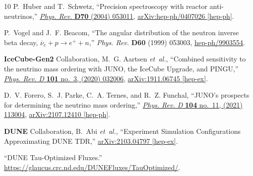 \documentclass[aps, prd, onecolumn, tightenlines, notitlepage, superscriptaddress, nofootinbib, preprintnumbers, floatfix,showkeys,11pt]{revtex4-2}
\begin{document}
\begin{thebibliography}{10}
P.~Huber and T.~Schwetz, ``{Precision spectroscopy with reactor
  anti-neutrinos},'' \href{http://dx.doi.org/10.1103/PhysRevD.70.053011}{{\em
  Phys. Rev.} {\bfseries D70} (2004) 053011},
\href{http://arxiv.org/abs/hep-ph/0407026}{{\ttfamily arXiv:hep-ph/0407026
  [hep-ph]}}.

P.~Vogel and J.~F. Beacom, ``The angular distribution of the neutron inverse
  beta decay, $\overline{\nu}_e + p \to e^+ + n$,'' {\em Phys. Rev.} {\bfseries
  D60} (1999) 053003,
\href{http://arxiv.org/abs/hep-ph/9903554}{{\ttfamily hep-ph/9903554}}.

{\bfseries IceCube-Gen2} Collaboration, M.~G. Aartsen {\em et~al.}, ``{Combined
  sensitivity to the neutrino mass ordering with JUNO, the IceCube Upgrade, and
  PINGU},'' \href{http://dx.doi.org/10.1103/PhysRevD.101.032006}{{\em Phys.
  Rev. D} {\bfseries 101} no.~3, (2020) 032006},
  \href{http://arxiv.org/abs/1911.06745}{{\ttfamily arXiv:1911.06745
  [hep-ex]}}.

D.~V. Forero, S.~J. Parke, C.~A. Ternes, and R.~Z. Funchal,
  ``{JUNO\textquoteright{}s prospects for determining the neutrino mass
  ordering},'' \href{http://dx.doi.org/10.1103/PhysRevD.104.113004}{{\em Phys.
  Rev. D} {\bfseries 104} no.~11, (2021) 113004},
  \href{http://arxiv.org/abs/2107.12410}{{\ttfamily arXiv:2107.12410
  [hep-ph]}}.

{\bfseries DUNE} Collaboration, B.~Abi {\em et~al.}, ``{Experiment Simulation
  Configurations Approximating DUNE TDR},''
  \href{http://arxiv.org/abs/2103.04797}{{\ttfamily arXiv:2103.04797
  [hep-ex]}}.

``{DUNE Tau-Optimized Fluxes}.''
\newblock \url{https://glaucus.crc.nd.edu/DUNEFluxes/TauOptimized/}.

\end{thebibliography}\endgroup
\end{document}
